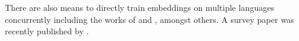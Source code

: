 \documentclass[parskip]{komatufte}
\begin{document}
There are also means to directly train embeddings on multiple languages concurrently including the works of  and , amongst others.
A survey paper was recently published by \textcite{Ruder17crosslingreview}.





\clearnotecolumn[notes]
\end{document}
